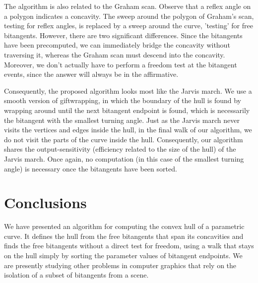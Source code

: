 \documentclass[11pt]{article}
\begin{document}
The algorithm is also related to the Graham scan.
Observe that a reflex angle on a polygon indicates a concavity.
The sweep around the polygon of Graham's scan, testing for reflex angles, is 
replaced by a sweep around the curve, 'testing' for free bitangents.
However, there are two significant differences.
Since the bitangents have been precomputed, we can immediately 
bridge the concavity without traversing it,
whereas the Graham scan must descend into the concavity.
Moreover, we don't actually have to perform a freedom test at the bitangent events, 
since the answer will always be in the affirmative.

Consequently, the proposed algorithm looks most like the Jarvis march.
We use a smooth version of giftwrapping, in which 
the boundary of the hull is found by wrapping around until the next bitangent endpoint is found,
which is necessarily the bitangent with the smallest turning angle.
Just as the Jarvis march never visits the vertices and edges inside the hull,
in the final walk of our algorithm, we do not visit the parts of the curve inside the hull.
Consequently, our algorithm shares the output-sensitivity (efficiency 
related to the size of the hull) of the Jarvis march.
Once again, no computation (in this case of the smallest turning angle) is necessary
once the bitangents have been sorted.



\section{Conclusions}
\label{sec:conclusions}

We have presented an algorithm for computing the convex hull of a parametric curve.
It defines the hull from the free bitangents that span its concavities
and finds the free bitangents without a direct test for freedom, using a walk that
stays on the hull simply by sorting the parameter values of bitangent endpoints.
We are presently studying other problems in computer graphics that rely on the
isolation of a subset of bitangents from a scene.
\end{document}
